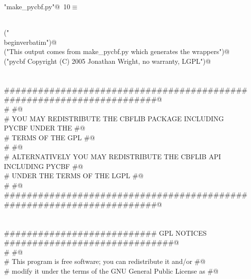 \documentclass[10pt,a4paper,twoside,notitlepage]{article}
\begin{document}
\begin{flushleft} \small
\begin{minipage}{\linewidth}\label{scrap8}\raggedright\small
{} \verb@"make_pycbf.py"@\nobreak\ {\footnotesize {10}}$\equiv$
\vspace{-1ex}
\begin{list}{}{} \item
\mbox{}\verb@@\\
\mbox{}\verb@print("\\begin{verbatim}")@\\
\mbox{}\verb@print("This output comes from make_pycbf.py which generates the wrappers")@\\
\mbox{}\verb@print("pycbf Copyright (C) 2005  Jonathan Wright, no warranty, LGPL")@\\
\mbox{}\verb@@\\
\mbox{}\verb@@\\
\mbox{}\verb@######################################################################@\\
\mbox{}\verb@#                                                                    #@\\
\mbox{}\verb@# YOU MAY REDISTRIBUTE THE CBFLIB PACKAGE INCLUDING PYCBF UNDER THE  #@\\
\mbox{}\verb@# TERMS OF THE GPL                                                   #@\\
\mbox{}\verb@#                                                                    #@\\
\mbox{}\verb@# ALTERNATIVELY YOU MAY REDISTRIBUTE THE CBFLIB API INCLUDING PYCBF  #@\\
\mbox{}\verb@# UNDER THE TERMS OF THE LGPL                                        #@\\
\mbox{}\verb@#                                                                    #@\\
\mbox{}\verb@######################################################################@\\
\mbox{}\verb@@\\
\mbox{}\verb@@\\
\mbox{}\verb@########################### GPL NOTICES ##############################@\\
\mbox{}\verb@#                                                                    #@\\
\mbox{}\verb@# This program is free software; you can redistribute it and/or      #@\\
\mbox{}\verb@# modify it under the terms of the GNU General Public License as     #@\\

\end{list}
\end{minipage}
\end{flushleft}
\end{document}
